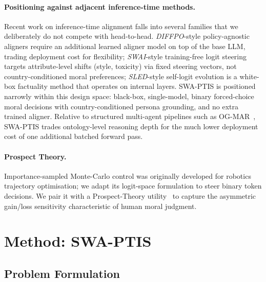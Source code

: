 \documentclass{article}
\begin{document}
\paragraph{Positioning against adjacent inference-time methods.}
Recent work on inference-time alignment falls into several families that we
deliberately do not compete with head-to-head. \emph{DIFFPO}-style
policy-agnostic aligners require an additional learned aligner model on top
of the base LLM, trading deployment cost for flexibility; \emph{SWAI}-style
training-free logit steering targets attribute-level shifts (style,
toxicity) via fixed steering vectors, not country-conditioned moral
preferences; \emph{SLED}-style self-logit evolution is a white-box
factuality method that operates on internal layers. SWA-PTIS is positioned
narrowly within this design space: black-box, single-model, binary
forced-choice moral decisions with country-conditioned persona grounding,
and no extra trained aligner. Relative to structured multi-agent pipelines
such as OG-MAR~\citep{ogmar2024}, SWA-PTIS trades ontology-level reasoning
depth for the much lower deployment cost of one additional batched forward
pass.

\paragraph{Prospect Theory.}
Importance-sampled Monte-Carlo control was originally developed for robotics
trajectory optimisation; we adapt its logit-space formulation to steer binary
token decisions. We pair it with a Prospect-Theory
utility~\citep{kahneman1979prospect} to capture the asymmetric gain/loss
sensitivity characteristic of human moral judgment.

\section{Method: SWA-PTIS}
\label{sec:method}

\subsection{Problem Formulation}
\label{sec:method:problem}
\end{document}
